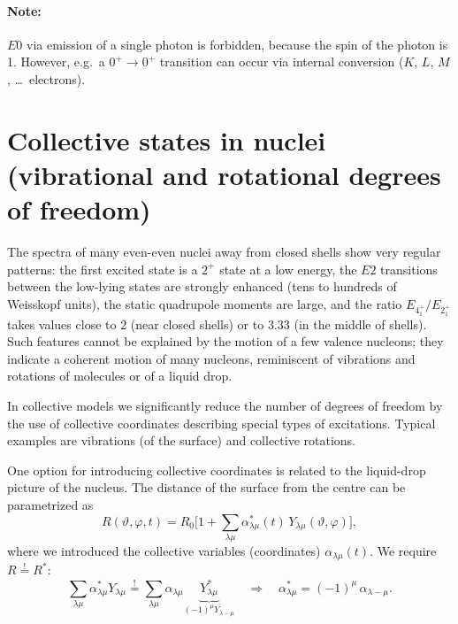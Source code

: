 \documentclass[11pt,a4paper]{article}
\begin{document}
\paragraph{Note:} $E0$ via emission of a single photon is forbidden, because the spin of the photon is 1. However, e.g.\ a $0^+\to0^+$ transition can occur via internal conversion ($K$, $L$, $M$, \dots\ electrons).

\section{Collective states in nuclei (vibrational and rotational degrees of freedom)}

\label{sec:coll}


The spectra of many even-even nuclei away from closed shells show very regular patterns: the first excited state is a $2^+$ state at a low energy, the $E2$ transitions between the low-lying states are strongly enhanced (tens to hundreds of Weisskopf units), the static quadrupole moments are large, and the ratio $E_{4^+_1}/E_{2^+_1}$ takes values close to $2$ (near closed shells) or to $3.33$ (in the middle of shells). Such features cannot be explained by the motion of a few valence nucleons; they indicate a coherent motion of many nucleons, reminiscent of vibrations and rotations of molecules or of a liquid drop.

In collective models we significantly reduce the number of degrees of freedom by the use of collective coordinates describing special types of excitations. Typical examples are vibrations (of the surface) and collective rotations.

One option for introducing collective coordinates is related to the liquid-drop picture of the nucleus. The distance of the surface from the centre can be parametrized as
\[
R(\vartheta,\varphi,t)=R_0\Big[1+\sum_{\lambda\mu}\alpha^*_{\lambda\mu}(t)\,Y_{\lambda\mu}(\vartheta,\varphi)\Big],
\]
where we introduced the collective variables (coordinates) $\alpha_{\lambda\mu}(t)$.
We require $R\overset{!}{=}R^*$:
\[
\sum_{\lambda\mu}\alpha^*_{\lambda\mu}Y_{\lambda\mu}\overset{!}{=}\sum_{\lambda\mu}\alpha_{\lambda\mu}\underbrace{Y^*_{\lambda\mu}}_{(-1)^\mu Y_{\lambda-\mu}}
\quad\Rightarrow\quad
\alpha^*_{\lambda\mu}=(-1)^\mu\,\alpha_{\lambda-\mu}.
\]
\end{document}
